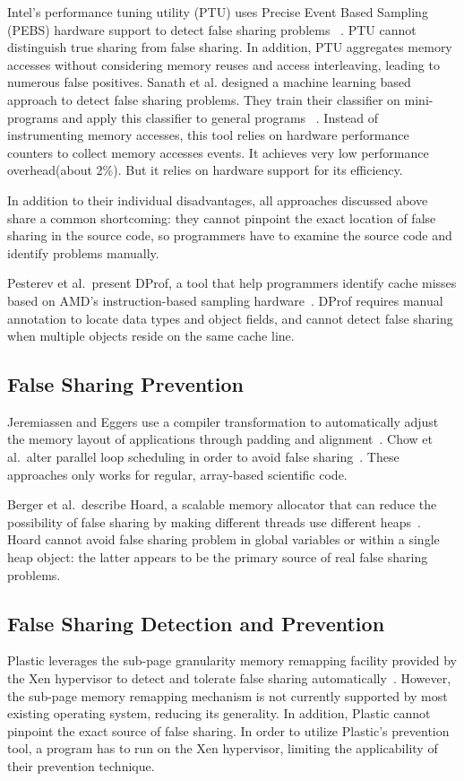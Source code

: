 Intel's performance tuning utility (PTU) uses Precise Event Based Sampling (PEBS) hardware support to detect false sharing problems ~\cite{detect:ptu, detect:intel}.  PTU cannot distinguish true sharing from false sharing. In addition, PTU aggregates memory accesses without considering memory reuses and access interleaving, leading to numerous false positives. Sanath et al. designed a machine learning based approach to detect false sharing problems. They train their classifier on mini-programs and apply this classifier to general programs ~\cite{mldetect}. Instead of instrumenting memory accesses, this tool relies on hardware performance counters to collect memory accesses events. It achieves very low performance overhead(about 2\%). But it relies on hardware support for its efficiency.  

In addition to their individual disadvantages,
all approaches discussed above share a common shortcoming:  
they cannot pinpoint the exact location of false sharing in the source code, so programmers have to examine the source code and identify problems manually.

Pesterev et al.\ present DProf, a tool that help programmers identify cache misses based on AMD's instruction-based sampling hardware~\cite{DProf}. DProf requires manual annotation to locate data types and object fields, and cannot detect false sharing when multiple objects reside on the same cache line.

\subsection{False Sharing Prevention}
\label{sec:fspreventwork}
Jeremiassen and Eggers use a compiler transformation to automatically adjust the memory layout of applications through padding and alignment~\cite{falseshare:compile}. Chow et al.\ alter parallel loop scheduling in order to avoid false
sharing~\cite{falseshare:schedule}. These approaches only works for regular, array-based scientific code.

Berger et al.\ describe Hoard, a scalable memory allocator that can reduce the possibility of false sharing by making different threads use different heaps~\cite{Hoard}. Hoard cannot avoid false sharing problem in global variables or within
a single heap object: the latter appears to be the primary source of real false sharing problems.

\subsection{False Sharing Detection and Prevention}

Plastic leverages the sub-page granularity memory remapping facility provided by the Xen hypervisor to detect and tolerate false sharing automatically~\cite{OSdetection}. However, the sub-page memory remapping mechanism is not currently supported by most existing operating system, reducing its generality. In addition, Plastic cannot pinpoint the exact source of false sharing.  
In order to utilize Plastic's prevention tool, a program has to run on the Xen hypervisor, limiting the applicability of their prevention technique.

